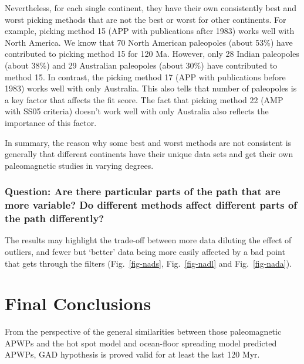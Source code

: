 Nevertheless, for each single continent, they have their own consistently best
and worst picking methods that are not the best or worst for other continents.
For example, picking method 15 (APP with publications after 1983) works well
with North America. We know that 70 North American paleopoles (about 53\%) have
contributed to picking method 15 for 120 Ma. However, only 28 Indian
paleopoles (about 38\%) and 29 Australian paleopoles (about 30\%) have
contributed to method 15. In contrast, the picking method 17 (APP with
publications before 1983) works well with only Australia. This also tells that
number of paleopoles is a key factor that affects the fit score. The fact that
picking method 22 (AMP with SS05 criteria) doesn't work well with only Australia
also reflects the importance of this factor.

In summary, the reason why some best and worst methods are not consistent is
generally that different continents have their unique data sets and get their
own paleomagnetic studies in varying degrees.

\subsubsection{Question: Are there particular parts of the path that are more
variable? Do different methods affect different parts of the path differently?}

The results may highlight the trade-off between more data diluting the effect of
outliers, and fewer but `better' data being more easily affected by a bad point
that gets through the filters (Fig.~\ref{fig-nads}, Fig.~\ref{fig-nadl} and
Fig.~\ref{fig-nada}).



\section{Final Conclusions}

From the perspective of the general similarities between those paleomagnetic
APWPs and the hot spot model and ocean-floor spreading model predicted APWPs,
GAD hypothesis is proved valid for at least the last 120 Myr.

